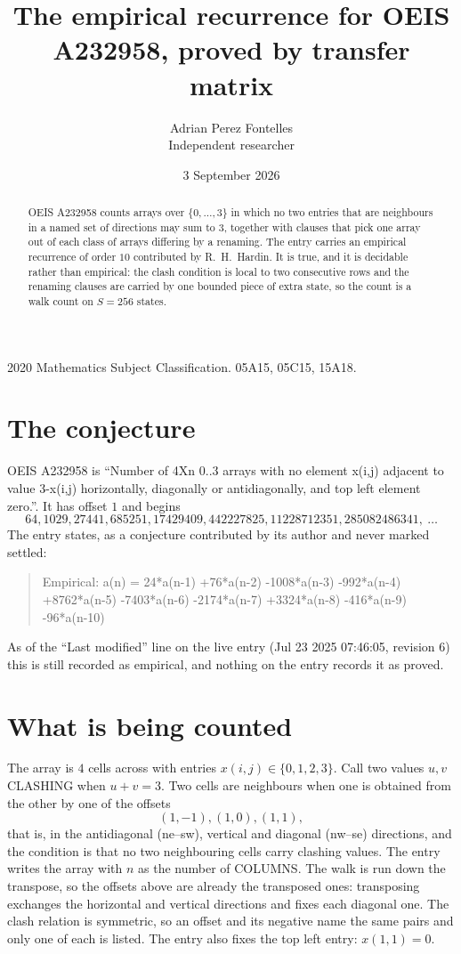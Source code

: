 \documentclass[11pt,a4paper]{article}
\title{The empirical recurrence for OEIS A232958, proved by transfer matrix}
\author{Adrian Perez Fontelles\\ \small Independent researcher}
\date{3 September 2026}
\theoremstyle{plain}
\theoremstyle{definition}
\begin{document}
\maketitle

\begin{abstract}
OEIS A232958 counts arrays over $\{0,\dots,3\}$ in which no two entries that are neighbours in
a named set of directions may sum to $3$, together with clauses that pick one array out of
each class of arrays differing by a renaming. The entry carries an empirical recurrence of
order $10$ contributed by R.~H.~Hardin. It is true, and it is decidable rather than
empirical: the clash condition is local to two consecutive rows and the renaming clauses are
carried by one bounded piece of extra state, so the count is a walk count on $S=256$ states.
\end{abstract}

\noindent\small 2020 Mathematics Subject Classification. 05A15, 05C15, 15A18.\normalsize

\section{The conjecture}

OEIS A232958 is ``Number of 4Xn 0..3 arrays with no element x(i,j) adjacent to value 3-x(i,j) horizontally, diagonally or antidiagonally, and top left element zero.''. It has offset $1$ and begins
\[
64, 1029, 27441, 685251, 17429409, 442227825, 11228712351, 285082486341,\ \dots
\]
The entry states, as a conjecture contributed by its author and never marked settled:
\begin{quote}
Empirical: a(n) = 24*a(n-1) +76*a(n-2) -1008*a(n-3) -992*a(n-4) +8762*a(n-5) -7403*a(n-6) -2174*a(n-7) +3324*a(n-8) -416*a(n-9) -96*a(n-10)
\end{quote}
As of the ``Last modified'' line on the live entry (Jul 23 2025 07:46:05, revision 6) this is still
recorded as empirical, and nothing on the entry records it as proved.

\section{What is being counted}

The array is $4$ cells across with entries $x(i,j)\in\{0,1,2,3\}$. Call two values $u,v$ CLASHING
when $u+v=3$. Two cells are neighbours when one is obtained from the other by one of
the offsets
\[
(1,-1), (1,0), (1,1),
\]
that is, in the antidiagonal (ne--sw), vertical and diagonal (nw--se) directions, and the condition is that no two neighbouring cells carry
clashing values. The entry writes the array with $n$ as the number of COLUMNS. The walk is run down the transpose, so the offsets above are already the transposed ones: transposing exchanges the horizontal and vertical directions and fixes each diagonal one. The clash relation is symmetric, so an offset and its negative name the
same pairs and only one of each is listed. The entry also fixes the top left entry: $x(1,1)=0$.
\end{document}
